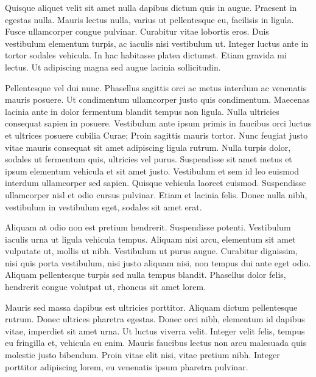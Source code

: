 \documentclass{ritsi/book}
\begin{document}
Quisque aliquet velit sit amet nulla dapibus dictum quis in augue. Praesent in egestas nulla. Mauris lectus nulla, varius ut pellentesque eu, facilisis in ligula. Fusce ullamcorper congue pulvinar. Curabitur vitae lobortis eros. Duis vestibulum elementum turpis, ac iaculis nisi vestibulum ut. Integer luctus ante in tortor sodales vehicula. In hac habitasse platea dictumst. Etiam gravida mi lectus. Ut adipiscing magna sed augue lacinia sollicitudin.

Pellentesque vel dui nunc. Phasellus sagittis orci ac metus interdum ac venenatis mauris posuere. Ut condimentum ullamcorper justo quis condimentum. Maecenas lacinia ante in dolor fermentum blandit tempus non ligula. Nulla ultricies consequat sapien in posuere. Vestibulum ante ipsum primis in faucibus orci luctus et ultrices posuere cubilia Curae; Proin sagittis mauris tortor. Nunc feugiat justo vitae mauris consequat sit amet adipiscing ligula rutrum. Nulla turpis dolor, sodales ut fermentum quis, ultricies vel purus. Suspendisse sit amet metus et ipsum elementum vehicula et sit amet justo. Vestibulum et sem id leo euismod interdum ullamcorper sed sapien. Quisque vehicula laoreet euismod. Suspendisse ullamcorper nisl et odio cursus pulvinar. Etiam et lacinia felis. Donec nulla nibh, vestibulum in vestibulum eget, sodales sit amet erat.

Aliquam at odio non est pretium hendrerit. Suspendisse potenti. Vestibulum iaculis urna ut ligula vehicula tempus. Aliquam nisi arcu, elementum sit amet vulputate ut, mollis ut nibh. Vestibulum ut purus augue. Curabitur dignissim, nisi quis porta vestibulum, nisi justo aliquam nisi, non tempus dui ante eget odio. Aliquam pellentesque turpis sed nulla tempus blandit. Phasellus dolor felis, hendrerit congue volutpat ut, rhoncus sit amet lorem.

Mauris sed massa dapibus est ultricies porttitor. Aliquam dictum pellentesque rutrum. Donec ultrices pharetra egestas. Donec orci nibh, elementum id dapibus vitae, imperdiet sit amet urna. Ut luctus viverra velit. Integer velit felis, tempus eu fringilla et, vehicula eu enim. Mauris faucibus lectus non arcu malesuada quis molestie justo bibendum. Proin vitae elit nisi, vitae pretium nibh. Integer porttitor adipiscing lorem, eu venenatis ipsum pharetra pulvinar.
\end{document}
